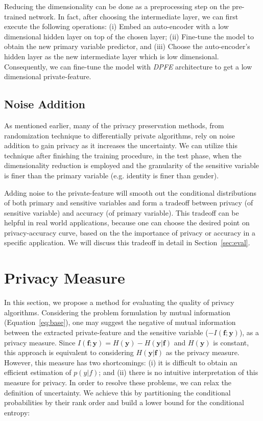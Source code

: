 \documentclass[10pt,journal,compsoc]{IEEEtran}
\begin{document}
Reducing the dimensionality can be done as a preprocessing step on the pre-trained network. In fact, after choosing the intermediate layer, we can first execute the following operations: (i) Embed an auto-encoder with a low dimensional hidden layer on top of the chosen layer; (ii) Fine-tune the model to obtain the new primary variable predictor, and (iii) Choose the auto-encoder's hidden layer as the new intermediate layer which is low dimensional. Consequently, we can fine-tune the model with \emph{DPFE} architecture to get a low dimensional private-feature.

\subsection{Noise Addition}\label{sec:noise}

As mentioned earlier, many of the privacy preservation methods, from randomization technique to differentially private algorithms, rely on noise addition to gain privacy as it increases the uncertainty. We can utilize this technique after finishing the training procedure, in the test phase, when the dimensionality reduction is employed and the granularity of the sensitive variable is finer than the primary variable (e.g. identity is finer than gender). 

Adding noise to the private-feature will smooth out the conditional distributions of both primary and sensitive variables and form a tradeoff between privacy (of sensitive variable) and accuracy (of primary variable). This tradeoff can be helpful in real world applications, because one can choose the desired point on privacy-accuracy curve, based on the the importance of privacy or accuracy in a specific application. We will discuss this tradeoff in detail in Section~\ref{sec:eval}.


\section{Privacy Measure}\label{sec:privacy}%

In this section, we propose a method for evaluating the quality of privacy algorithms. Considering the problem formulation by mutual information (Equation~\ref{eq:base}), one may suggest the negative of mutual information between the extracted private-feature and the sensitive variable ($-I(\textbf{f};\textbf{y})$), as a privacy measure. Since $I(\textbf{f};\textbf{y})=H(\textbf{y}) - H(\textbf{y}|\textbf{f})$ and $H(\textbf{y})$ is constant, this approach is equivalent to considering $H(\textbf{y}|\textbf{f})$ as the privacy measure. However, this measure has two shortcomings: (i) it is difficult to obtain an efficient estimation of $p(y|f)$; and (ii) there is no intuitive interpretation of this measure for privacy. In order to resolve these problems, we can relax the definition of uncertainty. We achieve this by partitioning the conditional probabilities by their rank order and build a lower bound for the conditional entropy:
\end{document}
